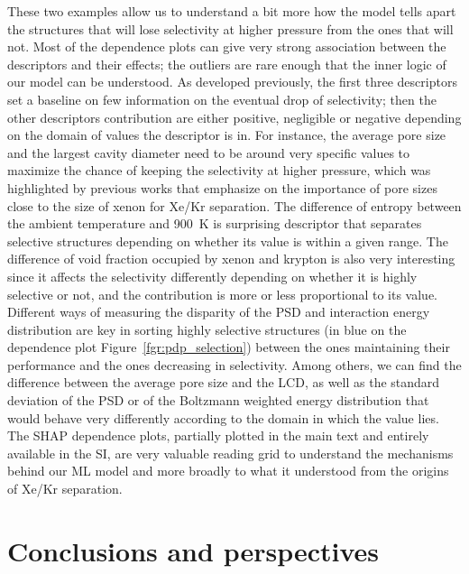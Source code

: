 \documentclass[main]{subfiles}
\begin{document}
These two examples allow us to understand a bit more how the model tells apart the structures that will lose selectivity at higher pressure from the ones that will not. Most of the dependence plots can give very strong association between the descriptors and their effects; the outliers are rare enough that the inner logic of our model can be understood. As developed previously, the first three descriptors set a baseline on few information on the eventual drop of selectivity; then the other descriptors contribution are either positive, negligible or negative depending on the domain of values the descriptor is in. For instance, the average pore size and the largest cavity diameter need to be around very specific values to maximize the chance of keeping the selectivity at higher pressure, which was highlighted by previous works that emphasize on the importance of pore sizes close to the size of xenon for Xe/Kr separation.\cite{Simon_2015, Ren_2021} The difference of entropy between the ambient temperature and \SI{900}{\kelvin} is surprising descriptor that separates selective structures depending on whether its value is within a given range. The difference of void fraction occupied by xenon and krypton is also very interesting since it affects the selectivity differently depending on whether it is highly selective or not, and the contribution is more or less proportional to its value. Different ways of measuring the disparity of the PSD and interaction energy distribution are key in sorting highly selective structures (in blue on the dependence plot Figure~\ref{fgr:pdp_selection}) between the ones maintaining their performance and the ones decreasing in selectivity. Among others, we can find the difference between the average pore size and the LCD, as well as the standard deviation of the PSD or of the Boltzmann weighted energy distribution that would behave very differently according to the domain in which the value lies. The SHAP dependence plots, partially plotted in the main text and entirely available in the SI, are very valuable reading grid to understand the mechanisms behind our ML model and more broadly to what it understood from the origins of Xe/Kr separation.

\section{Conclusions and perspectives}
\end{document}
